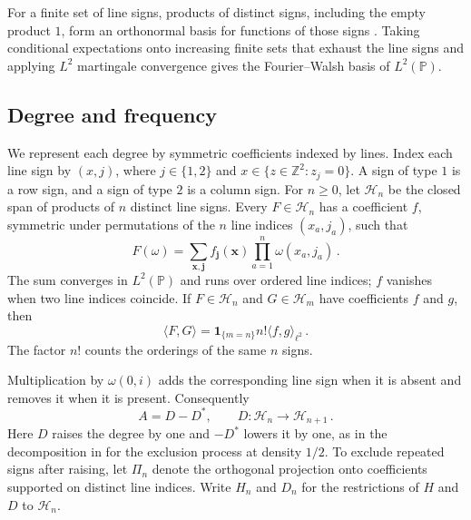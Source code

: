 \documentclass[11pt]{amsart}
\theoremstyle{plain}
\theoremstyle{definition}
\newcommand{\Z}{\mathbb Z}
\renewcommand{\P}{\mathbb P}
\newcommand{\1}{\mathbf 1}
\newcommand{\ip}[2]{\langle #1,#2\rangle}
\newcommand{\Hs}{\mathcal H}
\begin{document}
For a finite set of line signs, products of distinct signs, including
the empty product $1$, form an orthonormal basis for functions of those signs
\citep*[Theorem~1.5]{ODo14}.  Taking conditional expectations onto
increasing finite sets that exhaust the line signs and applying $L^2$
martingale convergence gives the Fourier--Walsh basis of $L^2(\P)$.

\subsection{Degree and frequency}\label{ssec:degree}

We represent each degree by symmetric coefficients indexed by lines.
Index each line sign by $(x,j)$, where $j\in\{1,2\}$ and
$x\in\{z\in\Z^2:z_j=0\}$.  A sign of type $1$ is a row sign,
and a sign of type $2$ is a column sign.  For $n\geq0$, let $\Hs_n$ be the closed span of
products of $n$ distinct line signs.  Every $F\in\Hs_n$ has a coefficient $f$, symmetric under permutations of
the $n$ line indices $(x_a,j_a)$, such that
\[
  F(\omega)=\sum_{\mathbf x,\mathbf j}f_{\mathbf j}(\mathbf x)
  \prod_{a=1}^n\omega(x_a,j_a)\, .
\]
The sum converges in $L^2(\P)$ and runs over ordered line indices;
$f$ vanishes when two line indices coincide.
If $F\in\Hs_n$ and
$G\in\Hs_m$ have coefficients $f$ and $g$, then
\begin{equation}\label{eq:iso}
  \ip FG=\1_{\{m=n\}}n!\ip fg_{\ell^2}\, .
\end{equation}
The factor $n!$ counts the orderings of the same $n$ signs.

Multiplication by $\omega(0,i)$ adds the corresponding line sign when it is
absent and removes it when it is present.  Consequently
\begin{equation}\label{eq:DA}
  A=D-D^*,\qquad D\colon\Hs_n\longrightarrow\Hs_{n+1}\, .
\end{equation}
Here $D$ raises the degree by one and $-D^*$ lowers it by one, as in the
decomposition in \citet*[(2.6)--(2.8)]{LQSY04} for the exclusion process
at density $1/2$.
To exclude repeated signs after raising, let $\Pi_n$ denote the
orthogonal projection onto coefficients supported on distinct line indices.
Write $H_n$ and $D_n$ for the restrictions of $H$ and $D$ to $\Hs_n$.
\end{document}
